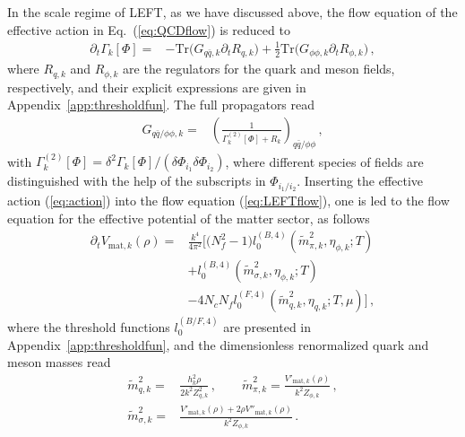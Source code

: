 \documentclass[%
reprint,
superscriptaddress,
showpacs,preprintnumbers,
 amsmath,amssymb,
 aps,
prd,
]{revtex4-1}
\def\Eq#1{Eq.~(\ref{#1})}
\def\eq#1{(\ref{#1})}
\def\app#1{Appendix~\ref{#1}}
\begin{document}
In the scale regime of LEFT, as we have discussed above, the flow equation of the effective action in \Eq{eq:QCDflow} is reduced to 
\begin{align}
\partial_t\Gamma_k[\Phi]=&-\mathrm{Tr}\Big(G_{q\bar q,k}\partial_t R_{q,k}\Big)+\frac{1}{2}\mathrm{Tr}\Big(G_{\phi\phi,k}\partial_t R_{\phi,k}\Big)\,,\label{eq:LEFTflow}
\end{align}
where $R_{q,k}$ and $R_{\phi,k}$ are the regulators for the quark and meson fields, respectively, and their explicit expressions are given in \app{app:thresholdfun}. The full propagators read
\begin{align}
G_{q\bar q/\phi\phi,k}=&\left(\frac{1}{\Gamma^{(2)}_k[\Phi]+R_k}\right)_{q\bar q/\phi\phi}\,,\label{}
\end{align}
with $\Gamma^{(2)}_k[\Phi]=\delta^2\Gamma_k[\Phi]/(\delta \Phi_{i_1}\delta \Phi_{i_2})$, where different species of fields are distinguished with the help of the subscripts in $\Phi_{i_1/i_2}$. Inserting the effective action \eq{eq:action} into the flow equation \eq{eq:LEFTflow}, one is led to the flow equation for the effective potential of the matter sector, as follows
\begin{align}
  \partial_t V_{\mathrm{mat},k}(\rho)=&\frac{k^4}{4\pi^2} \bigg [\big(N^2_f-1\big) l^{(B,4)}_{0}(\tilde{m}^{2}_{\pi,k},\eta_{\phi,k};T)\nonumber\\[2ex]
&+l^{(B,4)}_{0}(\tilde{m}^{2}_{\sigma,k},\eta_{\phi,k};T)\nonumber\\[2ex]
&-4N_c N_f l^{(F,4)}_{0}(\tilde{m}^{2}_{q,k},\eta_{q,k};T,\mu)\bigg]\,, \label{eq:flowV}
\end{align}
where the threshold functions $l^{(B/F,4)}_{0}$ are presented in \app{app:thresholdfun}, and the dimensionless renormalized quark and meson masses read
\begin{align}
  \tilde{m}^{2}_{q,k}=&\frac{h^{2}_{k}\rho}{2k^2Z^{2}_{q,k}}\,, \qquad \tilde{m}^{2}_{\pi,k}=\frac{V'_{\mathrm{mat},k}(\rho)}{k^2 Z_{\phi,k}}\,, \\[2ex]
  \tilde{m}^{2}_{\sigma,k}=&\frac{V'_{\mathrm{mat},k}(\rho)+2\rho V''_{\mathrm{mat},k}(\rho)}{k^2 Z_{\phi,k}}\,.\label{}
\end{align}
\end{document}
